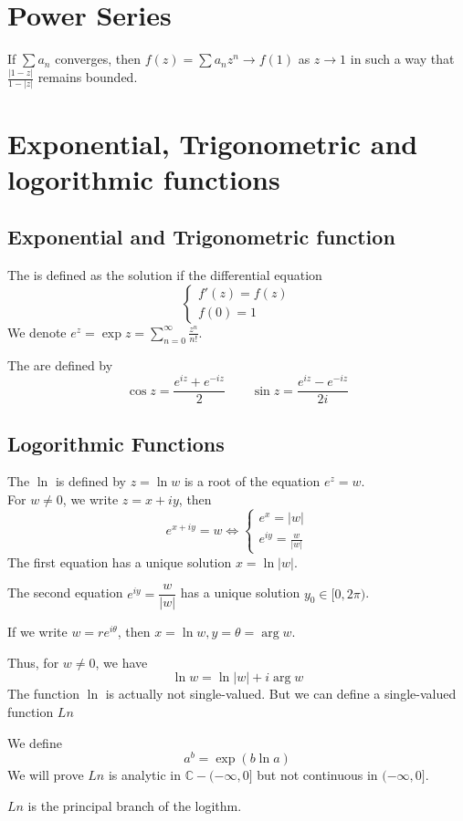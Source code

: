 \section{Power Series}
\begin{theorem}
If  $ \sum a_n  $ converges, then  $ f(z)=\sum a_nz^n\rightarrow f(1)  $ as  $ z\rightarrow 1  $ in such a way that  $ \frac{|1-z| }{1-|z| } $ remains bounded.
\end{theorem}
\section{Exponential, Trigonometric and logorithmic functions}
\subsection{Exponential and Trigonometric function}
The  is defined as the solution if the differential equation
\[\left\{
    \begin{aligned}
        f'(z)=f(z)\\
        f(0)=1
    \end{aligned}
\right.\]
We denote  $ e^z=\exp z=\sum\limits_{n=0}^\infty \frac{z^n}{n!} $.

The  are defined by 
\[\cos z=\frac{e^{iz}+e^{-iz}}{2}\qquad \sin z=\frac{e^{iz}-e^{-iz}}{2i}\]
\subsection{Logorithmic Functions}
The   $ \ln  $ is defined by  $ z=\ln w  $ is a root of the equation  $ e^z=w $.\\
For  $ w\not=0 $, we write  $ z=x+iy $, then 
\[e^{x+iy}=w\Leftrightarrow 
\left\{
    \begin{aligned}
        e^x=|w|\\
        e^{iy}=\frac{w }{|w|}
    \end{aligned}
\right.\]   
The first equation has a unique solution  $ x=\ln|w|  $.

The second equation  $ e^{iy}=\dfrac{w }{|w|}  $ has a unique solution  $ y_0\in [0,2\pi) $.

If we write  $ w=re^{i\theta} $, then  $ x=\ln w,y=\theta =\arg w $.

Thus, for  $ w\not=0  $, we have 
\[\ln w=\ln|w|+i\arg w\]
The function  $ \ln  $ is actually not single-valued. But we can define a single-valued function  $ Ln $ 

We define 
\[a^b=\exp(b\ln a)\]   
We will prove  $ Ln  $ is analytic in  $ \mathbb{C}-(-\infty,0] $ but not continuous in  $ (-\infty,0] $.

$ Ln  $ is the principal branch of the logithm.   